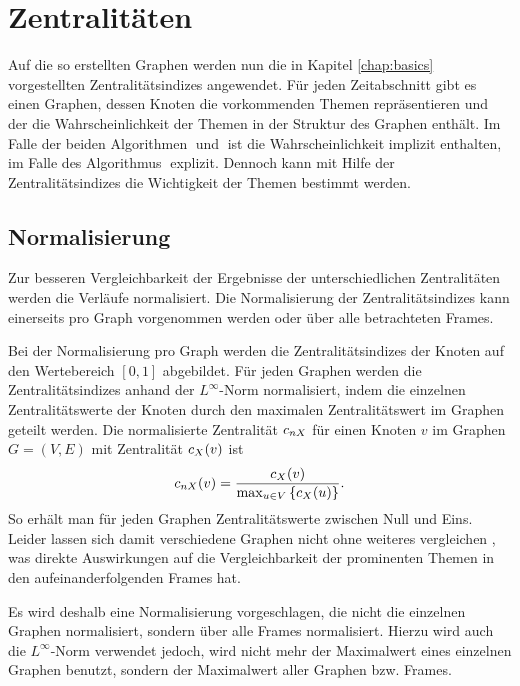 \section{Zentralitäten}

Auf die so erstellten Graphen werden nun die in Kapitel \ref{chap:basics} vorgestellten Zentralitätsindizes angewendet. Für jeden Zeitabschnitt gibt es einen Graphen, dessen Knoten die vorkommenden Themen repräsentieren und der die Wahrscheinlichkeit der Themen in der Struktur des Graphen enthält. Im Falle der beiden Algorithmen \CST$\;$und \CDC$\;$ist die Wahrscheinlichkeit implizit enthalten, im Falle des Algorithmus \TPR$\;$explizit. Dennoch kann mit Hilfe der Zentralitätsindizes die Wichtigkeit der Themen bestimmt werden.

\subsection{Normalisierung}
Zur besseren Vergleichbarkeit der Ergebnisse der unterschiedlichen Zentralitäten werden die Verläufe normalisiert. Die Normalisierung der Zentralitätsindizes kann einerseits pro Graph vorgenommen werden oder über alle betrachteten Frames. 

Bei der Normalisierung pro Graph werden die Zentralitätsindizes der Knoten auf den Wertebereich $[0,1]$ abgebildet. Für jeden Graphen werden die Zentralitätsindizes anhand der $L^\infty$-Norm normalisiert, indem die einzelnen Zentralitätswerte der Knoten durch den maximalen Zentralitätswert im Graphen geteilt werden. Die normalisierte Zentralität $c_{nX}$ für einen Knoten $v$ im Graphen $G=(V,E)$ mit Zentralität $c_{X}(v)$ ist
\begin{equation*}
c_{nX}(v) = \frac{c_{X}(v)}{\max_{u \in V}\left\lbrace c_{X}(u)\right\rbrace}\text{.}
\end{equation*}
So erhält man für jeden Graphen Zentralitätswerte zwischen Null und Eins. Leider lassen sich damit verschiedene Graphen nicht ohne weiteres vergleichen \citep{Brandes2005}, was direkte Auswirkungen auf die Vergleichbarkeit der prominenten Themen in den aufeinanderfolgenden Frames hat.

Es wird deshalb eine Normalisierung vorgeschlagen, die nicht die einzelnen Graphen normalisiert, sondern über alle Frames normalisiert. Hierzu wird auch die $L^\infty$-Norm verwendet jedoch, wird nicht mehr der Maximalwert eines einzelnen Graphen benutzt, sondern der Maximalwert aller Graphen bzw. Frames. 

